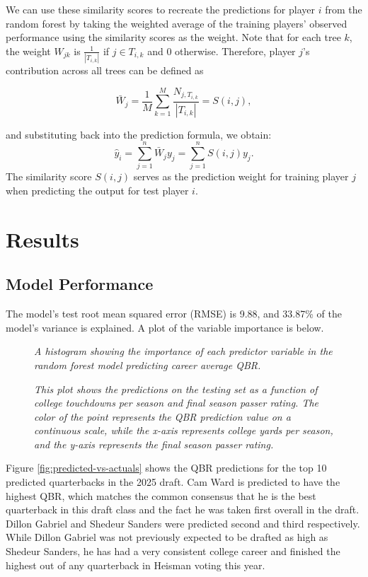 \documentclass{article}
\begin{document}
We can use these similarity scores to recreate the predictions for player $i$ from the random forest by taking the weighted average of the training players' observed performance using the similarity scores as the weight.  Note that for each tree $k$, the weight $W_{jk}$ is $\frac{1}{|T_{i,k}|}$ if $j \in T_{i,k}$ and $0$ otherwise. Therefore, player $j$'s contribution across all trees can be defined as

$$\bar{W}_j = \frac{1}{M} \sum_{k=1}^M \frac{N_{j,T_{i,k}}}{|T_{i,k}|} = S(i,j),$$

and substituting back into the prediction formula, we obtain:
\[
\hat{y}_i = \sum_{j=1}^n \bar{W}_j y_j = \sum_{j=1}^n S(i,j) y_j.
\]
The similarity score $S(i,j)$ serves as the prediction weight for training player $j$ when predicting the output for test player $i$. 

\section{Results}

\subsection{Model Performance}

The model's test root mean squared error (RMSE) is 9.88, and 33.87\% of the model's variance is explained. A plot of the variable importance is below. 

\begin{figure}[H]
    \centering
    \caption{\textit{A histogram showing the importance of each predictor variable in the random forest model predicting career average QBR.}}
    \label{fig:importance}
\end{figure}

\begin{figure}[H]
    \centering
    \caption{\textit{This plot shows the predictions on the testing set as a function of college touchdowns per season and final season passer rating. The color of the point represents the QBR prediction value on a continuous scale, while the x-axis represents college yards per season, and the y-axis represents the final season passer rating.}}
\end{figure}

Figure \ref{fig:predicted-vs-actuals} shows the QBR predictions for the top 10 predicted quarterbacks in the 2025 draft. Cam Ward is predicted to have the highest QBR, which matches the common consensus that he is the best quarterback in this draft class and the fact he was taken first overall in the draft. Dillon Gabriel and Shedeur Sanders were predicted second and third respectively. While Dillon Gabriel was not previously expected to be drafted as high as Shedeur Sanders, he has had a very consistent college career and finished the highest out of any quarterback in Heisman voting this year.
\end{document}
